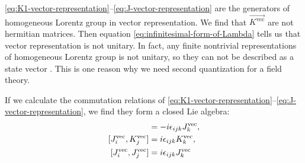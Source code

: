 \eqref{eq:K1-vector-representation}--\eqref{eq:J-vector-representation} are the generators of homogeneous Lorentz group in vector representation. We find that $\vec{K^\text{vec}}$ are not hermitian matrices. Then equation \eqref{eq:infinitesimal-form-of-Lambda} tells us that vector representation is not unitary. In fact, any finite nontrivial representations of homogeneous Lorentz group is not unitary, so they can not be described as a state vector . This is one reason why we need second quantization for a field theory.

If we calculate the commutation relations of \eqref{eq:K1-vector-representation}--\eqref{eq:J-vector-representation}, we find they form a closed Lie algebra:
\begin{align}
  [K_i^\text{vec},K_j^\text{vec}] &= -i \e_{ijk} J_k^\text{vec}, \label{eq:homogeneous-Lie-algebra-commutation-1} \\
  [J_i^\text{vec},K_j^\text{vec}] &=  i \e_{ijk} K_k^\text{vec}, \label{eq:homogeneous-Lie-algebra-commutation-2} \\
  [J_i^\text{vec},J_j^\text{vec}] &=  i \e_{ijk} J_k^\text{vec}  \label{eq:homogeneous-Lie-algebra-commutation-3}
\end{align}

